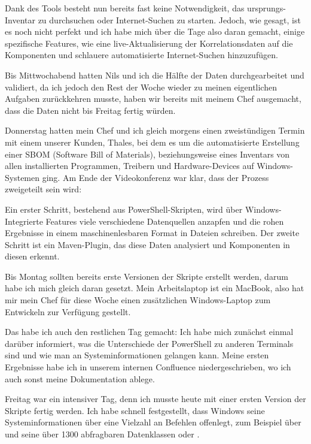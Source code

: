 Dank des Tools besteht nun bereits fast keine Notwendigkeit, das ursprungs-Inventar zu durchsuchen oder Internet-Suchen zu starten.
Jedoch, wie gesagt, ist es noch nicht perfekt und ich habe mich über die Tage also daran gemacht, einige spezifische Features, wie eine live-Aktualisierung der Korrelationsdaten auf die Komponenten und schlauere automatisierte Internet-Suchen hinzuzufügen.

Bis Mittwochabend hatten Nils und ich die Hälfte der Daten durchgearbeitet und validiert, da ich jedoch den Rest der Woche wieder zu meinen eigentlichen Aufgaben zurückkehren musste, haben wir bereits mit meinem Chef ausgemacht, dass die Daten nicht bis Freitag fertig würden.


Donnerstag hatten mein Chef und ich gleich morgens einen zweistündigen Termin mit einem unserer Kunden, Thales, bei dem es um die automatisierte Erstellung einer SBOM (Software Bill of Materials),
beziehungsweise eines Inventars von allen installierten Programmen, Treibern und Hardware-Devices auf Windows-Systemen ging.
Am Ende der Videokonferenz war klar, dass der Prozess zweigeteilt sein wird:

Ein erster Schritt, bestehend aus PowerShell-Skripten, wird über Windows-Integrierte Features viele verschiedene Datenquellen anzapfen und die rohen Ergebnisse in einem maschinenlesbaren Format in Dateien schreiben.
Der zweite Schritt ist ein Maven-Plugin, das diese Daten analysiert und Komponenten in diesen erkennt.

Bis Montag sollten bereits erste Versionen der Skripte erstellt werden, darum habe ich mich gleich daran gesetzt.
Mein Arbeitslaptop ist ein MacBook, also hat mir mein Chef für diese Woche einen zusätzlichen Windows-Laptop zum Entwickeln zur Verfügung gestellt.

Das habe ich auch den restlichen Tag gemacht:
Ich habe mich zunächst einmal darüber informiert, was die Unterschiede der PowerShell zu anderen Terminals sind und wie man an Systeminformationen gelangen kann.
Meine ersten Ergebnisse habe ich in unserem internen Confluence niedergeschrieben, wo ich auch sonst meine Dokumentation ablege.


Freitag war ein intensiver Tag, denn ich musste heute mit einer ersten Version der Skripte fertig werden.
Ich habe schnell festgestellt, dass Windows seine Systeminformationen über eine Vielzahl an Befehlen offenlegt, zum Beispiel über  und seine über 1300 abfragbaren Datenklassen oder .
